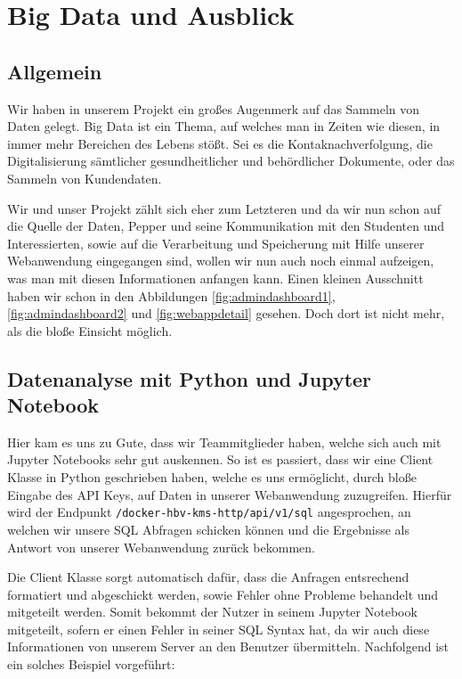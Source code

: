 \newcommand{\bigdatachapter}{Kapitel 7. }
\chapter{Big Data und Ausblick}
\label{chapter:big-data}
\lhead{\bigdatachapter \emph{Big Data und Ausblick}}

\section{Allgemein}
Wir haben in unserem Projekt ein großes Augenmerk auf das Sammeln von Daten gelegt. Big Data ist ein
Thema, auf welches man in Zeiten wie diesen, in immer mehr Bereichen des Lebens stößt.
Sei es die Kontaknachverfolgung, die Digitalisierung sämtlicher gesundheitlicher und behördlicher Dokumente,
oder das Sammeln von Kundendaten.

Wir und unser Projekt zählt sich eher zum Letzteren und da wir nun schon auf die Quelle der Daten, Pepper und
seine Kommunikation mit den Studenten und Interessierten, sowie auf die Verarbeitung und Speicherung mit Hilfe unserer
Webanwendung eingegangen sind, wollen wir nun auch noch einmal aufzeigen, was man mit diesen Informationen anfangen kann.
Einen kleinen Ausschnitt haben wir schon in den Abbildungen \ref{fig:admindashboard1}, \ref{fig:admindashboard2} und
\ref{fig:webappdetail} gesehen. Doch dort ist nicht mehr, als die bloße Einsicht möglich.

\section{Datenanalyse mit Python und Jupyter Notebook}
Hier kam es uns zu Gute, dass wir Teammitglieder haben, welche sich auch mit Jupyter Notebooks sehr gut auskennen.
So ist es passiert, dass wir eine Client Klasse in Python geschrieben haben, welche es uns ermöglicht, durch bloße
Eingabe des API Keys, auf Daten in unserer Webanwendung zuzugreifen. Hierfür wird der Endpunkt
\verb|/docker-hbv-kms-http/api/v1/sql| angesprochen, an welchen wir unsere SQL Abfragen schicken können und die
Ergebnisse als Antwort von unserer Webanwendung zurück bekommen.

Die Client Klasse sorgt automatisch dafür, dass
die Anfragen entsrechend formatiert und abgeschickt werden, sowie Fehler ohne Probleme behandelt und mitgeteilt werden.
Somit bekommt der Nutzer in seinem Jupyter Notebook mitgeteilt, sofern er einen Fehler in seiner SQL Syntax hat, da
wir auch diese Informationen von unserem Server an den Benutzer übermitteln.
Nachfolgend ist ein solches Beispiel vorgeführt:

